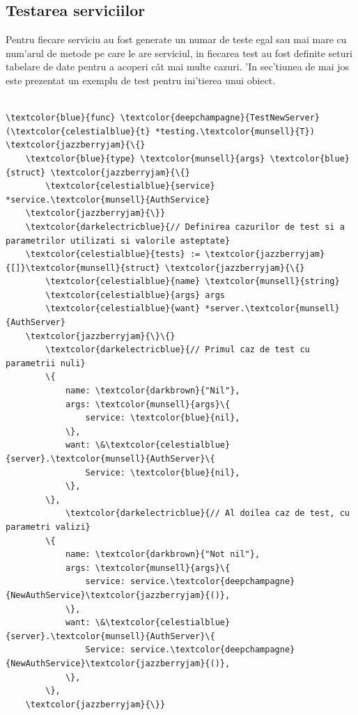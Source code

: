 \documentclass[12pt,a4paper,twoside]{report}
\begin{document}
\subsection{Testarea serviciilor}

Pentru fiecare serviciu au fost generate un numar de teste egal sau mai mare cu num'arul de metode pe care le are serviciul, in fiecarea test au fost definite seturi tabelare de date pentru a acoperi cât mai multe cazuri. 'In sec'tiunea de mai jos este prezentat un exemplu de test pentru ini'tierea unui obiect. 


\begin{tcolorbox}\label{test_example}
\scriptsize{
\begin{Verbatim}[commandchars=\\\{\}]

\textcolor{blue}{func} \textcolor{deepchampagne}{TestNewServer}(\textcolor{celestialblue}{t} *testing.\textcolor{munsell}{T}) \textcolor{jazzberryjam}{\{}
	\textcolor{blue}{type} \textcolor{munsell}{args} \textcolor{blue}{struct} \textcolor{jazzberryjam}{\{}
		\textcolor{celestialblue}{service} *service.\textcolor{munsell}{AuthService}
	\textcolor{jazzberryjam}{\}}
	\textcolor{darkelectricblue}{// Definirea cazurilor de test si a parametrilor utilizati si valorile asteptate}
	\textcolor{celestialblue}{tests} := \textcolor{jazzberryjam}{[]}\textcolor{munsell}{struct} \textcolor{jazzberryjam}{\{}
		\textcolor{celestialblue}{name} \textcolor{munsell}{string}
		\textcolor{celestialblue}{args} args
		\textcolor{celestialblue}{want} *server.\textcolor{munsell}{AuthServer}
	\textcolor{jazzberryjam}{\}\{}
		\textcolor{darkelectricblue}{// Primul caz de test cu parametrii nuli}
		\{
			name: \textcolor{darkbrown}{"Nil"},
			args: \textcolor{munsell}{args}\{
				service: \textcolor{blue}{nil},
			\},
			want: \&\textcolor{celestialblue}{server}.\textcolor{munsell}{AuthServer}\{
				Service: \textcolor{blue}{nil},
			\},
		\},
	        \textcolor{darkelectricblue}{// Al doilea caz de test, cu parametri valizi}
		\{
			name: \textcolor{darkbrown}{"Not nil"},
			args: \textcolor{munsell}{args}\{
				service: service.\textcolor{deepchampagne}{NewAuthService}\textcolor{jazzberryjam}{()},
			\},
			want: \&\textcolor{celestialblue}{server}.\textcolor{munsell}{AuthServer}\{
				Service: service.\textcolor{deepchampagne}{NewAuthService}\textcolor{jazzberryjam}{()},
			\},
		\},
	\textcolor{jazzberryjam}{\}}
	

\end{Verbatim}}
\end{tcolorbox}
\end{document}
